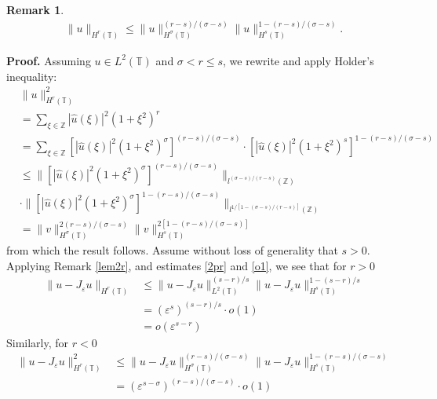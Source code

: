\documentclass[12pt,reqno]{amsart}
\newcommand{\zz}{\mathbb{Z}}
\newcommand{\ci}{\mathbb{T}}
\newcommand{\ee}{\varepsilon}
\theoremstyle{plain}  %
\newtheorem{remark}{Remark}
\theoremstyle{definition}
\begin{document}
\begin{appendices}
\begin{remark}
\begin{equation}
\begin{split}
			\|u\|_{H^{r}(\ci)} \le
			\|u\|_{H^\sigma(\ci)}^{(r-s)/(\sigma -s)}
			\|u\|_{H^s(\ci)}^{1 - (r-s)/(\sigma -s)}.
			\label{16u}
		\end{split}
	\end{equation}
\end{remark}
%
%
%
%
{\bf Proof.} Assuming $u \in L^2(\ci)$ and $\sigma < r \le s$,
we rewrite and apply Holder's inequality:
\begin{equation*}
	\begin{split}
		&\|u\|_{H^{r}(\ci)}^2
		\\
		& = \sum_{\xi \in \zz} |\widehat{u}(\xi)|^2 (1 + \xi^2)^{r}
		\\
		& = \sum_{\xi \in \zz}
		\left [|\widehat{u}(\xi)|^2 (1 + \xi^2)^\sigma \right ]^{(r-s)/(\sigma -s)}
		\cdot \left [ |\widehat{u}(\xi )
		|^2 (1+ \xi^2)^s \right ] ^{1 - (r-s)/(\sigma -s)} 
		\\
		& \le \|\left[ |\widehat{u}(\xi)|^2 (1 + \xi^2)^\sigma
		\right]^{(r-s)/(\sigma -s)} \|_{l^{(\sigma -s)/(r-s)}(\zz)}
		\\
		& \cdot \|\left[ |\widehat{u}(\xi)|^2 (1 + \xi^2)^\sigma
		\right]^{1- (r-s)/(\sigma -s)} \|_{l^{1/[1 -(\sigma -s)/(r-s)]}(\zz)}
		\\
		& = \|v\|_{H^\sigma(\ci)}^{2(r-s)/(\sigma -s)}
		\|v\|_{H^s(\ci)}^{2[1 - (r-s)/(\sigma -s)]}
	\end{split}
\end{equation*}
from which the result follows. 
\vskip0.1in
Assume without loss of generality that $s > 0$. Applying Remark \ref{lem2r}, and estimates \eqref{2pr} and \eqref{o1}, we
see that for $r>0$ 
\begin{equation*}
	\begin{split}
		\|u - J_\ee u \|_{H^r(\ci)}
		& \le \|u - J_\ee u
		\|_{L^2(\ci)}^{(s-r)/s} \|u - J_\ee u \|_{H^s(\ci)}^{1 -
		(s-r)/s}
		\\
		& = \left( \ee^{s} \right)^{(s-r)/s} \cdot o(1)
		\\
		& = o(\ee^{s-r})
	\end{split}
\end{equation*}
Similarly, for $r < 0$
\begin{equation*}
	\begin{split}
		\|u - J_\ee u \|_{H^r(\ci)}^2
		& \le \|u - J_\ee u
		\|_{H^\sigma(\ci)}^{(r-s)/(\sigma - s)} \|u - J_\ee u \|_{H^s(\ci)}^{1 -
		(r-s)/(\sigma -s)}
		\\
		& = \left( \ee^{s-\sigma} \right)^{(r-s)/(\sigma -s)} \cdot o(1)
		\\

\end{split}
\end{equation*}
\end{appendices}
\end{document}
